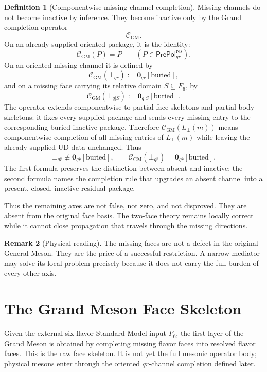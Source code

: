 \documentclass[11pt]{article}
\theoremstyle{definition}
\newtheorem{definition}{Definition}
\newtheorem{remark}[definition]{Remark}
\theoremstyle{plain}
\begin{document}
\begin{definition}[Componentwise missing-channel completion]
Missing channels do not become inactive by inference.  They become inactive
only by the Grand completion operator
\[
  \mathcal C_{\mathrm{GM}}.
\]
On an already supplied oriented package, it is the identity:
\[
  \mathcal C_{\mathrm{GM}}(P)=P
  \qquad
  (P\in\mathsf{PrePol}^{\mathrm{res}}_{q\bar r}).
\]
On an oriented missing channel it is defined by
\[
  \mathcal C_{\mathrm{GM}}(\bot_{q\bar r})
  :=
  \mathbf 0_{q\bar r}[\mathrm{buried}],
\]
and on a missing face carrying its relative domain \(S\subseteq F_6\), by
\[
  \mathcal C_{\mathrm{GM}}(\bot_{q|S})
  :=
  \mathbf 0_{q|S}[\mathrm{buried}].
\]
The operator extends componentwise to partial face skeletons and partial
body skeletons: it fixes every supplied package and sends every missing
entry to the corresponding buried inactive package.  Therefore
\(\mathcal C_{\mathrm{GM}}(L_{\bot}(m))\) means componentwise completion of
all missing entries of \(L_{\bot}(m)\) while leaving the already supplied
UD data unchanged.
Thus
\[
  \bot_{q\bar r}
  \not\equiv
  \mathbf 0_{q\bar r}[\mathrm{buried}],
  \qquad
  \mathcal C_{\mathrm{GM}}(\bot_{q\bar r})
  =
  \mathbf 0_{q\bar r}[\mathrm{buried}].
\]
The first formula preserves the distinction between absent and inactive;
the second formula names the completion rule that upgrades an absent
channel into a present, closed, inactive residual package.
\end{definition}

Thus the remaining axes are not false, not zero, and not disproved.  They
are absent from the original face basis.  The two-face theory remains
locally correct while it cannot close propagation that travels
through the missing directions.

\begin{remark}[Physical reading]
The missing faces are not a defect in the original General Meson.  They
are the price of a successful restriction.  A narrow mediator may solve its
local problem precisely because it does not carry the full burden of every
other axis.
\end{remark}

\section{The Grand Meson Face Skeleton}

Given the external six-flavor Standard Model input \(F_6\), the first layer
of the Grand Meson is obtained by completing missing flavor faces into
resolved flavor faces.  This is the raw face skeleton.  It is not yet the
full mesonic operator body; physical mesons enter through the oriented
\(q\bar r\)-channel completion defined later.
\end{document}
